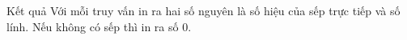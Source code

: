 Kết quả
Với mỗi truy vấn in ra hai số nguyên là số hiệu của sếp trực tiếp và số lính. Nếu không có sếp thì in ra số 0.